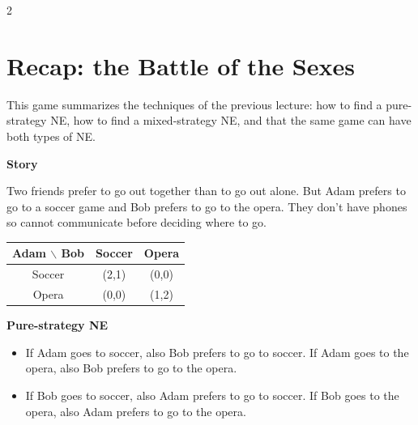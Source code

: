 \documentclass[a4paper,9pt]{extarticle}
\begin{document}

\thispagestyle{fancy}



\begin{multicols}{2}



\section{Recap: the Battle of the Sexes}


This game summarizes the techniques of the previous lecture: how to find a pure-strategy NE,
how to find a mixed-strategy NE, and that the same game can have both types of NE.


\begin{example}

\textbf{Story}

Two friends prefer to go out together than to go out alone. But Adam prefers to go to a
soccer game and Bob prefers to go to the opera. They don't have phones so cannot
communicate before deciding where to go.

\begin{center}
\begin{tabular}{c|cc}
Adam $\backslash$ Bob & Soccer & Opera \\
\hline
Soccer & (2,1) & (0,0) \\
Opera & (0,0) & (1,2) \\
\end{tabular}
\end{center}

\end{example}


\textbf{Pure-strategy NE}

\begin{itemize}

\item If Adam goes to soccer, also Bob prefers to go to soccer. If Adam goes to the opera,
also Bob prefers to go to the opera.

\item If Bob goes to soccer, also Adam prefers to go to soccer. If Bob goes to the opera,
also Adam prefers to go to the opera.

\end{itemize}


\begin{important}


\end{important}
\end{multicols}
\end{document}
